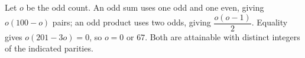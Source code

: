 Let $o$ be the odd count. An odd sum uses one odd and one even, giving $o(100-o)$ pairs; an odd product uses two odds, giving $\dfrac{o(o-1)}{2}$. Equality gives $o(201-3o)=0$, so $\boxed{o=0\text{ or }67}$. Both are attainable with distinct integers of the indicated parities.
